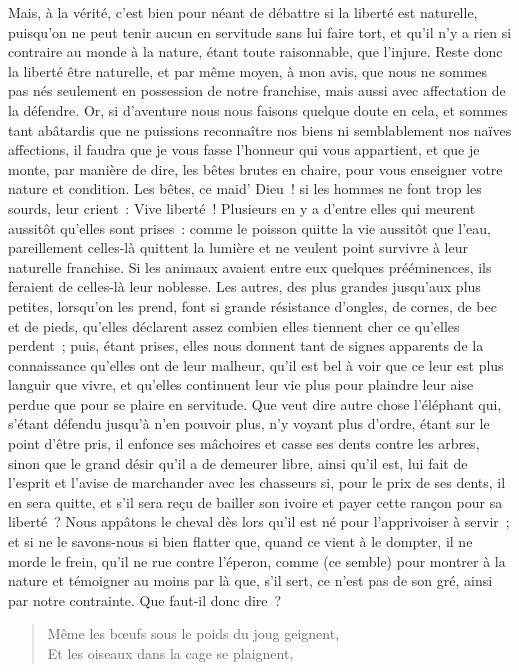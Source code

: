 \documentclass[french,twoside]{book} %
\begin{document}
Mais, à la vérité, c’est bien pour néant de débattre si la liberté est naturelle, puisqu’on ne peut tenir aucun en servitude sans lui faire tort, et qu’il n’y a rien si contraire au monde à la nature, étant toute raisonnable, que l’injure. Reste donc la liberté être naturelle, et par même moyen, à mon avis, que nous ne sommes pas nés seulement en possession de notre franchise, mais aussi avec affectation de la défendre. Or, si d’aventure nous nous faisons quelque doute en cela, et sommes tant abâtardis que ne puissions reconnaître nos biens ni semblablement nos naïves affections, il faudra que je vous fasse l’honneur qui vous appartient, et que je monte, par manière de dire, les bêtes brutes en chaire, pour vous enseigner votre nature et condition. Les bêtes, ce maid’ Dieu ! si les hommes ne font trop les sourds, leur crient : Vive liberté ! Plusieurs en y a d’entre elles qui meurent aussitôt qu’elles sont prises : comme le poisson quitte la vie aussitôt que l’eau, pareillement celles-là quittent la lumière et ne veulent point survivre à leur naturelle franchise. Si les animaux avaient entre eux quelques prééminences, ils feraient de celles-là leur noblesse. Les autres, des plus grandes jusqu’aux plus petites, lorsqu’on les prend, font si grande résistance d’ongles, de cornes, de bec et de pieds, qu’elles déclarent assez combien elles tiennent cher ce qu’elles perdent ; puis, étant prises, elles nous donnent tant de signes apparents de la connaissance qu’elles ont de leur malheur, qu’il est bel à voir que ce leur est plus languir que vivre, et qu’elles continuent leur vie plus pour plaindre leur aise perdue que pour se plaire en servitude. Que veut dire autre chose l’éléphant qui, s’étant défendu jusqu’à n’en pouvoir plus, n’y voyant plus d’ordre, étant sur le point d’être pris, il enfonce ses mâchoires et casse ses dents contre les arbres, sinon que le grand désir qu’il a de demeurer libre, ainsi qu’il est, lui fait de l’esprit et l’avise de marchander avec les chasseurs si, pour le prix de ses dents, il en sera quitte, et s’il sera reçu de bailler son ivoire et payer cette rançon pour sa liberté ? Nous appâtons le cheval dès lors qu’il est né pour l’apprivoiser à servir ; et si ne le savons-nous si bien flatter que, quand ce vient à le dompter, il ne morde le frein, qu’il ne rue contre l’éperon, comme (ce semble) pour montrer à la nature et témoigner au moins par là que, s’il sert, ce n’est pas de son gré, ainsi par notre contrainte. Que faut-il donc dire ?\par


\begin{verse}
Même les bœufs sous le poids du joug geignent,\\
Et les oiseaux dans la cage se plaignent,\\
\end{verse}
\end{document}
